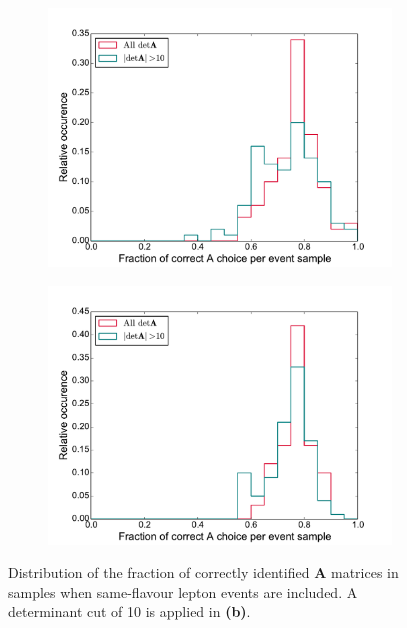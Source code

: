 \documentclass[twoside,english]{uiofysmaster}
\begin{document}
\begin{figure}[hbt]
	\centering
	\begin{subfigure}[b]{0.49\textwidth}
		\includegraphics[width=\textwidth]{figures/improving_combinatorics/histogram-OSFL-pairwise_A_selection-fraction_of_corr_A.pdf} 
		\caption{ }
		\label{fig:correct_A_preference_distribution_OSFL_a}
	\end{subfigure}
	\begin{subfigure}[b]{0.49\textwidth}
		\includegraphics[width=\textwidth]{figures/improving_combinatorics/histogram-OSFL50events-pairwise_A_selection-fraction_of_corr_A.pdf} 
		\caption{ }
		\label{fig:correct_A_preference_distribution_OSFL_b}
	\end{subfigure}
	\caption{Distribution of the fraction of correctly identified $\mathbf{A}$ matrices in samples when same-flavour lepton events are included. A determinant cut of 10 is applied in {\bf (b)}.}
	\label{fig:correct_A_preference_distribution_OSFL}
\end{figure}
\end{document}
